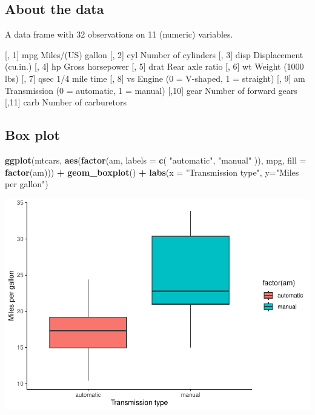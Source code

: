 \documentclass[
]{article}
\newenvironment{Shaded}{\begin{snugshade}}{\end{snugshade}}
\newcommand{\AttributeTok}[1]{\textcolor[rgb]{0.13,0.29,0.53}{#1}}
\newcommand{\FunctionTok}[1]{\textcolor[rgb]{0.13,0.29,0.53}{\textbf{#1}}}
\newcommand{\NormalTok}[1]{#1}
\newcommand{\SpecialCharTok}[1]{\textcolor[rgb]{0.81,0.36,0.00}{\textbf{#1}}}
\newcommand{\StringTok}[1]{\textcolor[rgb]{0.31,0.60,0.02}{#1}}
\begin{document}
\subsection{About the data}\label{about-the-data}

A data frame with 32 observations on 11 (numeric) variables.

{[}, 1{]} mpg Miles/(US) gallon {[}, 2{]} cyl Number of cylinders {[},
3{]} disp Displacement (cu.in.) {[}, 4{]} hp Gross horsepower {[}, 5{]}
drat Rear axle ratio {[}, 6{]} wt Weight (1000 lbs) {[}, 7{]} qsec 1/4
mile time {[}, 8{]} vs Engine (0 = V-shaped, 1 = straight) {[}, 9{]} am
Transmission (0 = automatic, 1 = manual) {[},10{]} gear Number of
forward gears {[},11{]} carb Number of carburetors

\subsection{Box plot}\label{box-plot}

\begin{Shaded}
\begin{Highlighting}[]
\FunctionTok{ggplot}\NormalTok{(mtcars, }\FunctionTok{aes}\NormalTok{(}\FunctionTok{factor}\NormalTok{(am, }\AttributeTok{labels =} \FunctionTok{c}\NormalTok{(}
    \StringTok{"automatic"}\NormalTok{, }\StringTok{"manual"}
\NormalTok{)), mpg, }\AttributeTok{fill =} \FunctionTok{factor}\NormalTok{(am))) }\SpecialCharTok{+}
    \FunctionTok{geom\_boxplot}\NormalTok{() }\SpecialCharTok{+}
    \FunctionTok{labs}\NormalTok{(}\AttributeTok{x =} \StringTok{"Transmission type"}\NormalTok{, }\AttributeTok{y=}\StringTok{"Miles per gallon"}\NormalTok{)}
\end{Highlighting}
\end{Shaded}

\includegraphics{Regression-Model-Course-Assignment_files/figure-latex/unnamed-chunk-20-1.pdf}
\end{document}
